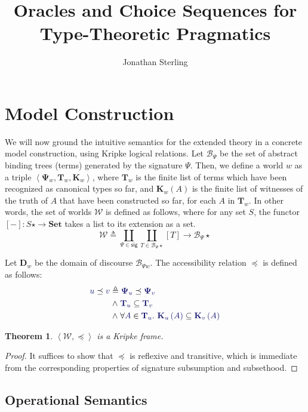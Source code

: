 \documentclass[11pt]{amsart}
\newtheorem{thm}{Theorem}[section]
\theoremstyle{definition}
\theoremstyle{remark}
\numberwithin{equation}{section}
\def\InputModeColorName{MidnightBlue}
\newcommand\IMode[1]{{\color{\InputModeColorName}{#1}}}
\newcommand\Sig[1]{\mathbf{\Psi}_{#1}}
\newcommand\PrecEq[2]{\IMode{#1}\preceq\IMode{#2}}
\newcommand\Pair[2]{\left\langle #1, #2 \right\rangle}
\newcommand\Member[2]{\IMode{#1} \in \IMode{#2}}
\newcommand\Worlds{\mathcal{W}}
\newcommand\MkWorld[3]{\left\langle #1, #2, #3\right\rangle}
\newcommand\List[1]{#1\star}
\newcommand\SETS{\mathbf{Set}}
\newcommand\Ext[1]{\left[#1\right]}
\newcommand\Term[1]{\mathcal{B}_{#1}}
\newcommand\SubsetEq[2]{\IMode{#1}\subseteq\IMode{#2}}
\newcommand\Dom[1]{\mathbf{D}_{#1}}
\newcommand\Types[1]{\mathbf{T}_{#1}}
\newcommand\Witnesses[1]{\mathbf{K}_{#1}}
\newcommand\WitnessesOf[2]{\Witnesses{#1}\left(#2\right)}
\begin{document}
\title{Oracles and Choice Sequences for Type-Theoretic Pragmatics}

\author{Jonathan Sterling}
\address{}

\maketitle

\section{Model Construction}

We will now ground the intuitive semantics for the extended theory in a
concrete model construction, using Kripke logical relations.  Let $\Term\Psi$
be the set of abstract binding trees (terms) generated by the signature $\Psi$.
Then, we define a world $w$ as a triple
$\MkWorld{\Sig{w}}{\Types{w}}{\Witnesses{w}}$, where $\Types{w}$ is the finite
list of terms which have been recognized as canonical types so far, and
$\WitnessesOf{w}{A}$ is the finite list of witnesses of the truth of $A$ that
have been constructed so far, for each $A$ in $\Types{w}$. In other words, the
set of worlds $\Worlds$ is defined as follows, where for any set $S$, the
functor $\Ext{-} : \List{S}\to\SETS$ takes a list to its extension as a set.
\[
  \Worlds
    \triangleq
     \coprod_{\Psi\in \mathsf{sig}}
      \coprod_{T\in\List{\Term{\Psi}}}
       \Ext{T}\to\List{\Term\Psi}
\]

Let $\Dom{w}$ be the domain of discourse $\Term{\Psi{w}}$. The accessibility
relation $\preceq$ is defined as follows:
\begin{align*}
  \PrecEq{u}{v}
   &\triangleq
    \PrecEq{\Sig{u}}{\Sig{v}}\\
     &\mathrel\land
      \SubsetEq{\Types{u}}{\Types{v}}\\
       &\mathrel\land
        \forall\Member{A}{\Types{u}}.\ \SubsetEq{\WitnessesOf{u}{A}}{\WitnessesOf{v}{A}}
\end{align*}

\begin{thm}
  $\Pair{\Worlds}{\preceq}$ is a Kripke frame.
\end{thm}
\begin{proof}
  It suffices to show that $\preceq$ is reflexive and transitive, which is immediate from the corresponding properties of signature subsumption and subsethood.
\end{proof}

\subsection{Operational Semantics}
\end{document}
